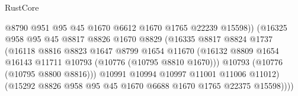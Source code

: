 \begin{lexlean}{RustCore}
\begin{coremodule}
                                        @8790
                                        @951
                                        @95
                                        @45
                                        @1670
                                        @6612
                                        @1670
                                        @1765
                                        @22239
                                        @15598))
                                    (@16325
                                      @958
                                      @95
                                      @45
                                      @8817
                                      @8826
                                      @1670
                                      @8829
                                      (@16335
                                        @8817
                                        @8824
                                        @1737
                                        (@16118
                                          @8816
                                          @8823
                                          @1647
                                          @8799
                                          @1654
                                          @11670
                                          (@16132
                                            @8809
                                            @1654
                                            @16143
                                            @11711
                                            @10793
                                            (@10776 (@10795 @8810 @1670)))
                                          @10793
                                          (@10776 (@10795 @8800 @8816)))
                                        @10991
                                        @10994
                                        @10997
                                        @11001
                                        @11006
                                        @11012)
                                      (@15292
                                        @8826
                                        @958
                                        @95
                                        @45
                                        @1670
                                        @6688
                                        @1670
                                        @1765
                                        @22375
                                        @15598))))

\end{coremodule}
\end{lexlean}
